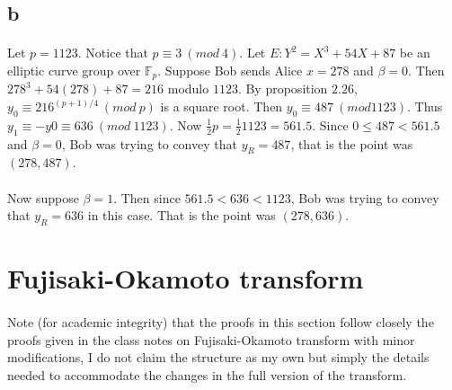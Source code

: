 \documentclass[letterpaper,12pt,oneside,onecolumn]{report}
\begin{document}
\subsection*{b}
\paragraph{}
Let $p = 1123$. Notice that $p \equiv 3\ (mod\ 4)$. Let $E: Y^2 = X^3 + 54X + 87$ be an elliptic curve group over $\mathbb{F}_p$. Suppose Bob sends Alice $x=278$ and $\beta = 0$. Then $278^3 + 54(278) + 87 = 216$ modulo $1123$. By proposition $2.26$, $y_0 \equiv 216^{(p+1)/4}\ (mod\ p)$ is a square root. Then $y_0 \equiv 487\ (mod 1123)$. Thus $y_1 \equiv -y0 \equiv 636\ (mod\ 1123)$. Now $\frac{1}{2}p = \frac{1}{2}1123 = 561.5$. Since $0 \leq 487 < 561.5$ and $\beta = 0$, Bob was trying to convey that $y_R = 487$, that is the point was $(278, 487)$.
\paragraph{}
Now suppose $\beta = 1$. Then since $561.5 < 636 < 1123$, Bob was trying to convey that $y_R = 636$ in this case. That is the point was $(278, 636)$.
\section*{Fujisaki-Okamoto transform}
\paragraph{}
Note (for academic integrity) that the proofs in this section follow closely the proofs given in the class notes on Fujisaki-Okamoto transform with minor modifications, I do not claim the structure as my own but simply the details needed to accommodate the changes in the full version of the transform.
\end{document}
